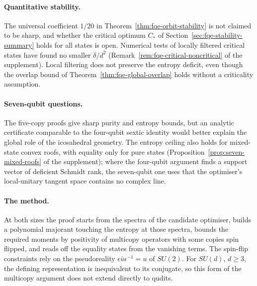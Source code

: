 \documentclass[11pt]{article}
\begin{document}
\paragraph{Quantitative stability.} The universal coefficient $1/20$ in
Theorem~\ref{thm:fqe-orbit-stability} is not claimed to be sharp, and whether the critical optimum $C_*$ of
Section~\ref{sec:fqe-stability-summary} holds for all states is open. Numerical tests of locally filtered
critical states have found no smaller $\delta/d^2$
(Remark~\ref{rem:fqe-critical-noncritical} of the supplement). Local filtering does not preserve the entropy deficit,
even though the overlap bound of Theorem~\ref{thm:fqe-global-overlap} holds without a
criticality assumption.

\paragraph{Seven-qubit questions.} The five-copy proofs give sharp purity and
entropy bounds, but an analytic certificate comparable to the four-qubit
sextic identity would better explain the global role of the icosahedral
geometry. The entropy ceiling also holds for mixed-state convex roofs, with equality only for pure states
(Proposition~\ref{prop:seven-mixed-roofs} of the supplement); where the four-qubit argument finds a support vector of
deficient Schmidt rank, the seven-qubit one uses that the optimiser's local-unitary tangent space contains no complex line.

\paragraph{The method.} At both sizes the proof starts from the spectra of the candidate optimiser, builds a
polynomial majorant touching the entropy at those spectra, bounds the required moments by positivity of
multicopy operators with some copies spin flipped, and reads off the equality states from the vanishing
terms. The spin-flip constraints rely on the pseudoreality $\epsilon\bar u\epsilon^{-1}=u$ of $SU(2)$. For $SU(d)$,
$d\ge3$, the defining representation is inequivalent to its conjugate, so this form of the multicopy argument does not extend directly
to qudits.
\end{document}
